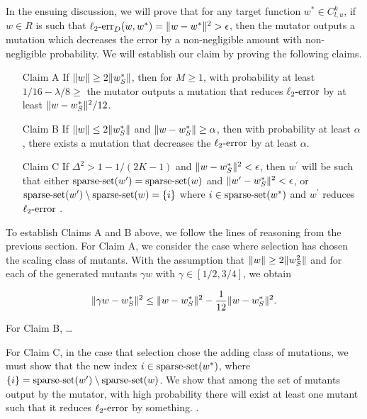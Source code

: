 In the ensuing discussion, we will prove that for any target function
$w^* \in C^k_{l,u}$, if $w \in R$ is such that
$\mathrm{\ell_2\mbox{-}err}_D(w, w^*) = \Vert w - w^* \Vert^2 > \epsilon$,
then the mutator outputs a mutation which decreases the error by a
non-negligible amount with non-negligible probability.
We will establish our claim by proving the following claims.

\begin{enumerate}
\item[Claim A] If $\Vert w \Vert \ge 2 \Vert w^*_S \Vert$, then for $M \ge 1$,
with probability at least $1/16 - \lambda/8 \ge $  the mutator outputs
a mutation that reduces $\mathrm{\ell_2\mbox{-}error}$ by at least $\Vert w - w^*_S \Vert^2 / 12$.
\item[Claim B] If $\Vert w \Vert \le 2 \Vert w^*_S \Vert$ and
$\Vert w - w^*_S \Vert \ge \alpha$, then with probability at least $\alpha$,
there exists a mutation that decreases the $\mathrm{\ell_2\mbox{-}error}$ by at least $\alpha$.
\item[Claim C] If $\Delta^2 > 1 - 1/(2 K - 1)$ and
$\Vert w - w^*_S \Vert^2 < \epsilon$, then $w^\prime$ will be
such that either $\mathrm{sparse\mbox{-}set}(w^\prime) = \mathrm{sparse\mbox{-}set}(w)$ and
$\Vert w^\prime - w^*_S \Vert^2 < \epsilon$, or
$\mathrm{sparse\mbox{-}set}(w^\prime) \setminus \mathrm{sparse\mbox{-}set}(w) = \{i\}$ where $i \in \mathrm{sparse\mbox{-}set}(w^*)$
and $w^\prime$ reduces $\mathrm{\ell_2\mbox{-}error}$ .
\end{enumerate}

To establish Claims A and B above, we follow the lines of reasoning from the
previous section.
For Claim A, we consider the case where selection has chosen the scaling class
of mutants.  With the assumption that $\Vert w \Vert \ge 2 \Vert w_S^2 \Vert$ and
for each of the generated mutants $\gamma w$ with $\gamma \in [1/2, 3/4]$,
we obtain

\[
\Vert \gamma w - w^*_S \Vert^2 \le \Vert w - w^*_S \Vert^2 - \frac{1}{12}\Vert w - w^*_S \Vert^2.
\]

For Claim B, \dots

For Claim C, in the case that selection chose the adding class of mutations,
we must show that the new index $i \in \mathrm{sparse\mbox{-}set}(w^*)$, where
$\{i\} = \mathrm{sparse\mbox{-}set}(w^\prime) \setminus \mathrm{sparse\mbox{-}set}(w)$.
We show that among the set of mutants output by the mutator, with high probability
there will exist at least one mutant such that it reduces $\mathrm{\ell_2\mbox{-}error}$ by something.
.

